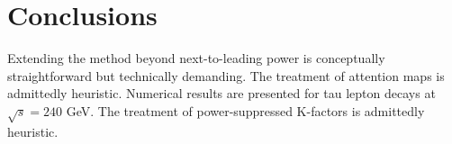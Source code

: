 \section{Conclusions}\label{sec:conclusions}

Extending the method beyond next-to-leading power is conceptually
straightforward but technically demanding. The treatment of attention
maps is admittedly heuristic. Numerical results are presented for tau
lepton decays at $\sqrt{s} = 240$ GeV. The treatment of power-suppressed
K-factors is admittedly heuristic.

